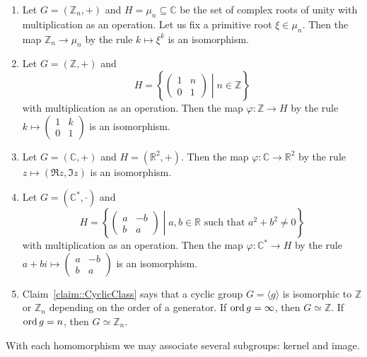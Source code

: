 \begin{examples}
\begin{enumerate}
\item Let $G = (\mathbb Z_n, +)$ and $H = \mu_n\subseteq \mathbb C$ be the set of complex roots of unity with multiplication as an operation.
Let us fix a primitive root $\xi \in\mu_n$.
Then the map $\mathbb Z_n \to \mu_n$ by the rule $k \mapsto \xi^k$ is an isomorphism.

\item Let $G = (\mathbb Z, +)$ and 
\[
H = \left\{\left.
\begin{pmatrix}
{1}&{n}\\
{0}&{1}
\end{pmatrix}
\;\right|\;
n\in \mathbb Z
\right\}
\]
with multiplication as an operation.
Then the map $\varphi\colon \mathbb Z\to H$ by the rule $k \mapsto \left(\begin{smallmatrix}{1}&{k}\\{0}&{1}\end{smallmatrix}\right)$ is an isomorphism.

\item Let $G = (\mathbb C, +)$ and $H = (\mathbb R^2, +)$.
Then the map $\varphi \colon \mathbb C\to \mathbb R^2$ by the rule $z \mapsto (\Re z, \Im z)$ is an isomorphism.

\item Let $G = (\mathbb C^*, \cdot)$ and 
\[
H = \left\{\left.
\begin{pmatrix}
{a}&{-b}\\
{b}&{a}
\end{pmatrix}
\;\right|\;
a, b\in \mathbb R\text{ such that }a^2 + b^2 \neq 0
\right\}
\]
with multiplication as an operation.
Then the map $\varphi \colon \mathbb C^*\to H$ by the rule  $a + bi \mapsto \left(\begin{smallmatrix}{a}&{-b}\\{b}&{a}\end{smallmatrix}\right)$ is an isomorphism.

\item Claim~\ref{claim::CyclicClass} says that a cyclic group $G = \langle g \rangle$ is isomorphic to $\mathbb Z$ or $\mathbb Z_n$ depending on the order of a generator.
If $\operatorname{ord} g = \infty$, then $G\simeq \mathbb Z$.
If $\operatorname{ord} g = n$, then $G\simeq \mathbb Z_n$.
\end{enumerate}
\end{examples}

With each homomorphism we may associate several subgroups: kernel and image.

